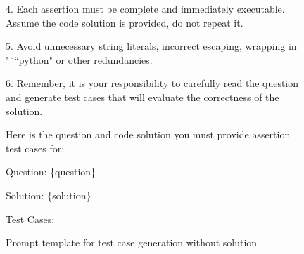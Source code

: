 \begin{figure*}[ht!]
\begin{tcolorbox}[title={Test Case Generation With Solution Prompt}, colback=red!0, left=2pt,right=2pt,top=0pt,bottom=0pt]
{4. Each assertion must be complete and immediately executable. Assume the code solution is provided, do not repeat it.

5. Avoid unnecessary string literals, incorrect escaping, wrapping in "```python" or other redundancies.

6. Remember, it is your responsibility to carefully read the question and generate test cases that will evaluate the correctness of the solution.


\vspace{0.3cm}
Here is the question and code solution you must provide assertion test cases for:

\vspace{0.3cm}
Question: \{question\}
\vspace{0.3cm}

Solution: \{solution\}
\vspace{0.3cm}

Test Cases:
}
\end{tcolorbox}


  \caption{Prompt template for test case generation without solution}
  \label{fig:prompt_without_solutions}
  \vspace{-0.3in}
\end{figure*}
